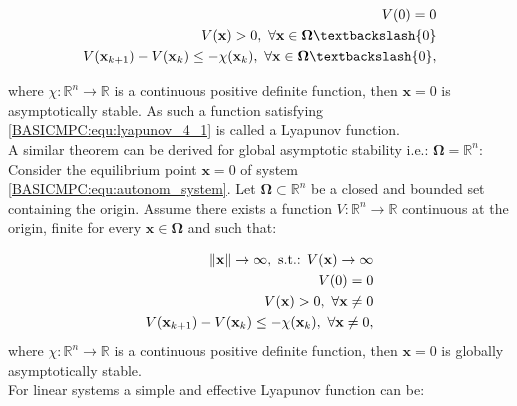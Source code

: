     \begin{subequations}
    \label{BASICMPC:equ:lyapunov_4_1}
        \begin{align}
                V(0)=0 \label{BASICMPC:equ:lyapunov_4_1_a}\\
                V(\textbf{x})>0,\textnormal{ }\forall\textbf{x}\in\boldsymbol{\Omega}\textbackslash\{0\} \label{BASICMPC:equ:lyapunov_4_1_b}\\
                V(\textbf{x}_{k+1})-V(\textbf{x}_{k})\leq-\chi(\textbf{x}_k),\textnormal{ }\forall\textbf{x}\in\boldsymbol{\Omega}\textbackslash\{0\}, \label{BASICMPC:equ:lyapunov_4_1_c}
        \end{align}
    \end{subequations}

     where $\chi:\mathbb{R}^n\rightarrow\mathbb{R}$ is a continuous positive definite function, then $\textbf{x}=0$ is asymptotically stable. As such a function satisfying \ref{BASICMPC:equ:lyapunov_4_1} is called a Lyapunov function.\\
     A similar theorem can be derived for global asymptotic stability i.e.: $\boldsymbol{\Omega}=\mathbb{R}^n$:
     Consider the equilibrium point $\textbf{x}=0$ of system \ref{BASICMPC:equ:autonom_system}. Let $\boldsymbol{\Omega}\subset\mathbb{R}^n$ be a closed and bounded set containing the origin. Assume there exists a function $V:\mathbb{R}^n\rightarrow\mathbb{R}$ continuous at the origin, finite for every $\textbf{x}\in\boldsymbol{\Omega}$ and such that:

     \begin{subequations}
    \label{BASICMPC:equ:lyapunov_4_2}
        \begin{align}
                \left\lVert\textbf{x}\right\rVert\rightarrow\infty,\textnormal{ s.t.: }V(\textbf{x})\rightarrow\infty \label{BASICMPC:equ:lyapunov_4_2_a}\\
                V(0)=0 \label{BASICMPC:equ:lyapunov_4_2_b}\\
                V(\textbf{x})>0,\textnormal{ }\forall\textbf{x}\neq0 \label{BASICMPC:equ:lyapunov_4_2_c}\\
                V(\textbf{x}_{k+1})-V(\textbf{x}_{k})\leq-\chi(\textbf{x}_k),\textnormal{ }\forall\textbf{x}\neq0, \label{BASICMPC:equ:lyapunov_4_2_d}
            \end{align}
            \end{subequations}
     where $\chi:\mathbb{R}^n\rightarrow\mathbb{R}$ is a continuous positive definite function, then $\textbf{x}=0$ is globally asymptotically stable.\\
     For linear systems a simple and effective Lyapunov function can be:

